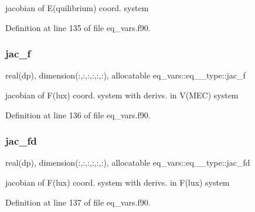 jacobian of E(quilibrium) coord. system 



Definition at line 135 of file eq\+\_\+vars.\+f90.

\mbox{\label{structeq__vars_1_1eq__2__type_a24c4f457690f1a873d501b6f6fc6c697}} 
\subsubsection{\texorpdfstring{jac\+\_\+f}{jac\_f}}
{\footnotesize\ttfamily real(dp), dimension(\+:,\+:,\+:,\+:,\+:,\+:), allocatable eq\+\_\+vars\+::eq\+\_\+\_\+type\+::jac\+\_\+f}



jacobian of F(lux) coord. system with derivs. in V(\+M\+E\+C) system 



Definition at line 136 of file eq\+\_\+vars.\+f90.

\mbox{\label{structeq__vars_1_1eq__2__type_a17d09b18196fe427feaa96d691146e01}} 
\subsubsection{\texorpdfstring{jac\+\_\+fd}{jac\_fd}}
{\footnotesize\ttfamily real(dp), dimension(\+:,\+:,\+:,\+:,\+:,\+:), allocatable eq\+\_\+vars\+::eq\+\_\+\_\+type\+::jac\+\_\+fd}



jacobian of F(lux) coord. system with derivs. in F(lux) system 



Definition at line 137 of file eq\+\_\+vars.\+f90.

\mbox{\label{structeq__vars_1_1eq__2__type_a4652c259ba9e243ca2cd3f78fbf4f5ac}} 
